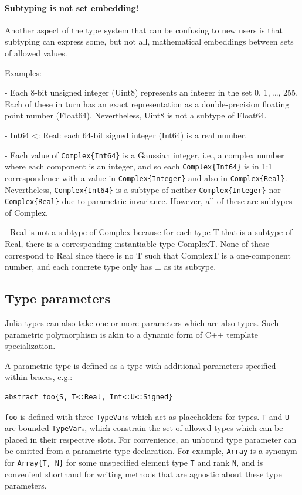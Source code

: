 \documentclass[pldi]{sigplanconf-pldi15}
\begin{document}
\paragraph{Subtyping is not set embedding!}
Another aspect of the type system that can be confusing to new users is that
subtyping can express some, but not all, mathematical embeddings between sets
of allowed values.

Examples:

- Each 8-bit unsigned integer (Uint8) represents an integer in the set {0, 1,
\dots, 255}. Each of these in turn has an exact representation as a
double-precision floating point number (Float64). Nevertheless, Uint8 is not a
subtype of Float64.

- Int64  <: Real: each 64-bit signed integer (Int64) is a real number.

- Each value of \verb|Complex{Int64}| is a Gaussian integer, i.e., a complex number
where each component is an integer, and so each \verb|Complex{Int64}| is in 1:1
correspondence with a value in \verb|Complex{Integer}| and also in \verb|Complex{Real}|.
Nevertheless, \verb|Complex{Int64}| is a subtype of neither \verb|Complex{Integer}| nor
\verb|Complex{Real}| due to parametric invariance. However, all of these are subtypes
of Complex.

- Real is not a subtype of Complex because for each type T that is a subtype of
Real, there is a corresponding instantiable type  Complex{T}. None of these
correspond to Real since there is no T such that Complex{T} is a one-component
number, and each concrete type only has $\bot$ as its subtype.  


\subsection{Type parameters}

Julia types can also take one or more parameters which are also types. Such
parametric polymorphism is akin to a dynamic form of C++ template
specialization.

A parametric type is defined as a type with additional parameters specified
within braces, e.g.:

\begin{lstlisting}
abstract foo{S, T<:Real, Int<:U<:Signed}
\end{lstlisting}
%
\verb|foo| is defined with three \verb|TypeVar|s which act as placeholders for
types. \verb|T| and \verb|U| are bounded \verb|TypeVar|s, which constrain the
set of allowed types which can be placed in their respective slots. For
convenience, an unbound type parameter can be omitted from a parametric type
declaration. For example, \verb|Array| is a synonym for \verb|Array{T, N}|
for some unspecified element type \verb|T| and rank \verb|N|, and is convenient
shorthand for writing methods that are agnostic about these type parameters.
\end{document}
